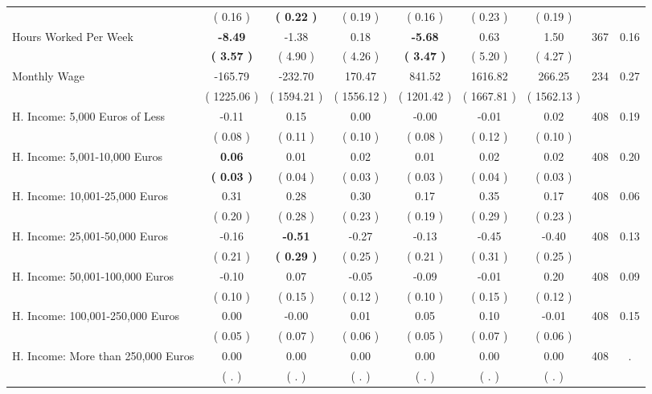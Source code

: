 \begin{tabular}{lcccccccc}
 & (     0.16 ) & \textbf{(     0.22 )} & (     0.19 ) & (     0.16 ) & (     0.23 ) & (     0.19 ) & \\
Hours Worked Per Week & \textbf{    -8.49} &     -1.38 &      0.18 & \textbf{    -5.68} &      0.63 &      1.50 & 367 &       0.16 \\ 
 & \textbf{(     3.57 )} & (     4.90 ) & (     4.26 ) & \textbf{(     3.47 )} & (     5.20 ) & (     4.27 ) & \\
Monthly Wage &   -165.79 &   -232.70 &    170.47 &    841.52 &   1616.82 &    266.25 & 234 &       0.27 \\ 
 & (  1225.06 ) & (  1594.21 ) & (  1556.12 ) & (  1201.42 ) & (  1667.81 ) & (  1562.13 ) & \\
H. Income: 5,000 Euros of Less &     -0.11 &      0.15 &      0.00 &     -0.00 &     -0.01 &      0.02 & 408 &       0.19 \\ 
 & (     0.08 ) & (     0.11 ) & (     0.10 ) & (     0.08 ) & (     0.12 ) & (     0.10 ) & \\
H. Income: 5,001-10,000 Euros & \textbf{     0.06} &      0.01 &      0.02 &      0.01 &      0.02 &      0.02 & 408 &       0.20 \\ 
 & \textbf{(     0.03 )} & (     0.04 ) & (     0.03 ) & (     0.03 ) & (     0.04 ) & (     0.03 ) & \\
H. Income: 10,001-25,000 Euros &      0.31 &      0.28 &      0.30 &      0.17 &      0.35 &      0.17 & 408 &       0.06 \\ 
 & (     0.20 ) & (     0.28 ) & (     0.23 ) & (     0.19 ) & (     0.29 ) & (     0.23 ) & \\
H. Income: 25,001-50,000 Euros &     -0.16 & \textbf{    -0.51} &     -0.27 &     -0.13 &     -0.45 &     -0.40 & 408 &       0.13 \\ 
 & (     0.21 ) & \textbf{(     0.29 )} & (     0.25 ) & (     0.21 ) & (     0.31 ) & (     0.25 ) & \\
H. Income: 50,001-100,000 Euros &     -0.10 &      0.07 &     -0.05 &     -0.09 &     -0.01 &      0.20 & 408 &       0.09 \\ 
 & (     0.10 ) & (     0.15 ) & (     0.12 ) & (     0.10 ) & (     0.15 ) & (     0.12 ) & \\
H. Income: 100,001-250,000 Euros &      0.00 &     -0.00 &      0.01 &      0.05 &      0.10 &     -0.01 & 408 &       0.15 \\ 
 & (     0.05 ) & (     0.07 ) & (     0.06 ) & (     0.05 ) & (     0.07 ) & (     0.06 ) & \\
H. Income: More than 250,000 Euros &      0.00 &      0.00 &      0.00 &      0.00 &      0.00 &      0.00 & 408 &          . \\ 
 & (        . ) & (        . ) & (        . ) & (        . ) & (        . ) & (        . ) & \\
\bottomrule
\end{tabular}
